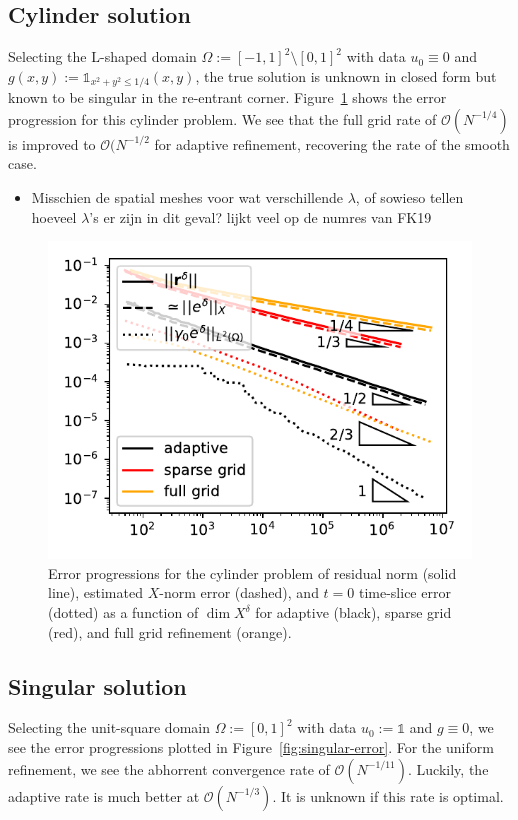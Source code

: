 \documentclass[11pt,a4paper,oneside,english]{amsart}
\numberwithin{equation}{section}
\numberwithin{theorem}{section}
\theoremstyle{definition}
\newcommand{\jw}[1]{{\color{red}{JW: #1}}}
\newcommand{\bbone}{\mathds{1}}
\begin{document}
\subsection{Cylinder solution}
Selecting the L-shaped domain $\Omega := [-1,1]^2 \setminus [0,1]^2$ with data
$u_0 \equiv 0$ and $g(x,y) := \bbone_{{x^2 + y^2 \leq 1/4}}(x,y)$, the true
solution is unknown in closed form but known to be singular in the re-entrant
corner.\jw{is het wel singulier? of alleen minder regulier? hier wil ik een citatie of *iets* anders}
Figure~\ref{fig:cylinder} shows the error progression for this cylinder problem.
We see that the full grid rate of $\mathcal O(N^{-1/4})$ is improved to $\mathcal O(N^{-1/2}$
for adaptive refinement, recovering the rate of the smooth case.

\begin{itemize}
  \item Misschien de spatial meshes voor wat verschillende $\lambda$, of sowieso
    tellen hoeveel $\lambda$'s er zijn in dit geval? lijkt veel op de numres van FK19
\end{itemize}
\begin{figure}
  \includegraphics[width=0.5\linewidth]{cylinder_adaptive_errors}
  \caption{Error progressions for the cylinder problem of residual norm (solid line),
  estimated $X$-norm error (dashed), and $t=0$ time-slice error (dotted) as a function
  of $\dim X^\delta$ for adaptive (black), sparse grid (red), and full grid refinement (orange).\jw{dit plaatje kan opnieuw want die rates zijn eigenlijk net anders}}
  \label{fig:cylinder}
\end{figure}

\subsection{Singular solution}
Selecting the unit-square domain $\Omega := [0,1]^2$ with data $u_0 := \bbone$
and $g \equiv 0$, we see the error progressions plotted in Figure~\ref{fig:singular-error}.
For the uniform refinement, we see the abhorrent convergence rate of $\mathcal O(N^{-1/11})$.
Luckily, the adaptive rate is much better at $\mathcal O(N^{-1/3})$. It is unknown
if this rate is optimal.
\end{document}
